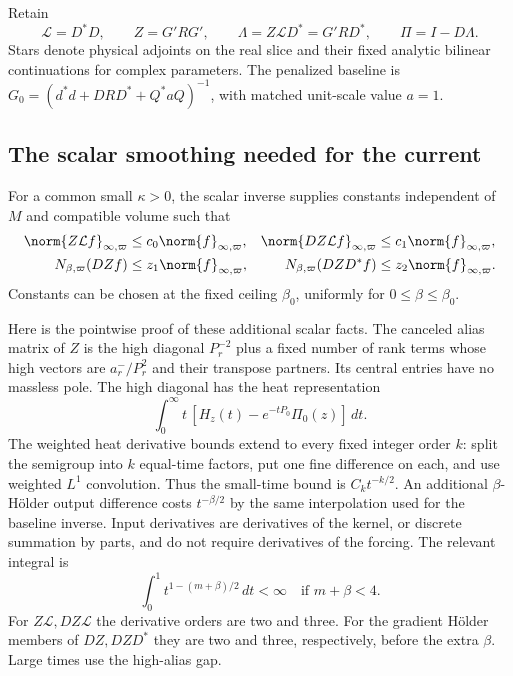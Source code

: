 Retain
\begin{equation}\label{pc-scalar-data}
 \mathcal L=D^*D,\qquad Z=G'RG',\qquad
 \Lambda=Z\mathcal L D^*=G'RD^*,\qquad \Pi=I-D\Lambda.
\end{equation}
Stars denote physical adjoints on the real slice and their fixed
analytic bilinear continuations for complex parameters. The
penalized baseline is
$G_0=(d^*d+DRD^*+Q^*aQ)^{-1}$, with matched unit-scale value $a=1$.

\subsection{The scalar smoothing needed for the current}

For a common small $\kappa>0$, the scalar inverse supplies constants
independent of $M$ and compatible volume such that
\begin{align}
 \norm{Z\mathcal L f}_{\infty,\varpi}
       &\le c_0\norm{f}_{\infty,\varpi},&
 \norm{DZ\mathcal L f}_{\infty,\varpi}
       &\le c_1\norm{f}_{\infty,\varpi},
       \label{pc-scalar-bounded}\\
 N_{\beta,\varpi}(DZf)
       &\le z_1\norm{f}_{\infty,\varpi},&
 N_{\beta,\varpi}(DZD^*f)
       &\le z_2\norm{f}_{\infty,\varpi}.
       \label{pc-scalar-holder}
\end{align}
Constants can be chosen at the fixed ceiling $\beta_0$, uniformly
for $0\le\beta\le\beta_0$.

Here is the pointwise proof of these additional scalar facts. The
canceled alias matrix of $Z$ is the high diagonal $P_r^{-2}$ plus
a fixed number of rank terms whose high vectors are $a_r^-/P_r^2$
and their transpose partners. Its central entries have no massless
pole. The high diagonal has the heat representation
\begin{equation}\label{pc-biharmonic-heat}
 \int_0^\infty t\,[H_z(t)-e^{-tP_0}\Pi_0(z)]\,dt.
\end{equation}
The weighted heat derivative bounds extend to every fixed integer
order $k$: split the semigroup into $k$ equal-time factors, put one
fine difference on each, and use weighted $L^1$ convolution.
Thus the small-time bound is $C_kt^{-k/2}$. An additional
$\beta$-H\"older output difference costs $t^{-\beta/2}$ by the
same interpolation used for the baseline inverse. Input derivatives
are derivatives of the kernel, or discrete summation by parts, and
do not require derivatives of the forcing. The relevant integral is
\[
 \int_0^1 t^{1-(m+\beta)/2}\,dt<\infty
                  \quad\text{if }m+\beta<4.
\]
For $Z\mathcal L,DZ\mathcal L$ the derivative orders are two and
three. For the gradient H\"older members of $DZ,DZD^*$ they are
two and three, respectively, before the extra $\beta$. Large times
use the high-alias gap.

